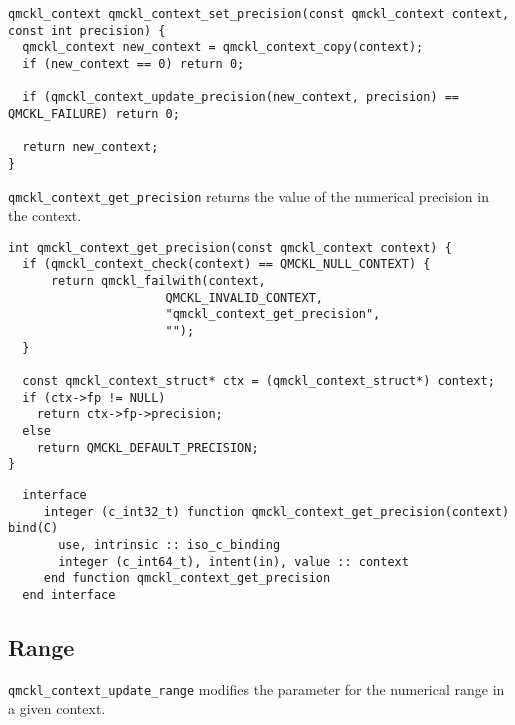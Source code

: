 \begin{verbatim}
qmckl_context qmckl_context_set_precision(const qmckl_context context, const int precision) {
  qmckl_context new_context = qmckl_context_copy(context);
  if (new_context == 0) return 0;

  if (qmckl_context_update_precision(new_context, precision) == QMCKL_FAILURE) return 0;

  return new_context;
}
\end{verbatim}

\texttt{qmckl\_context\_get\_precision} returns the value of the numerical precision in the context.

\begin{verbatim}
int qmckl_context_get_precision(const qmckl_context context) {
  if (qmckl_context_check(context) == QMCKL_NULL_CONTEXT) {
      return qmckl_failwith(context,
                      QMCKL_INVALID_CONTEXT,
                      "qmckl_context_get_precision",
                      "");
  }

  const qmckl_context_struct* ctx = (qmckl_context_struct*) context;
  if (ctx->fp != NULL) 
    return ctx->fp->precision;
  else
    return QMCKL_DEFAULT_PRECISION;
}
\end{verbatim}

\begin{verbatim}
  interface
     integer (c_int32_t) function qmckl_context_get_precision(context) bind(C)
       use, intrinsic :: iso_c_binding
       integer (c_int64_t), intent(in), value :: context
     end function qmckl_context_get_precision
  end interface
\end{verbatim}

\subsection{Range}
\label{sec:org014eb35}

\texttt{qmckl\_context\_update\_range} modifies the parameter for the numerical range in a given context.

